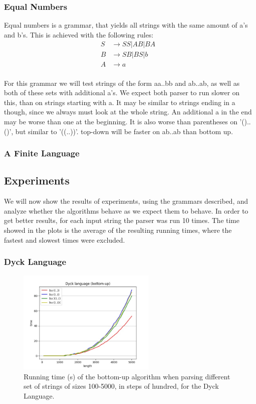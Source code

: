 \subsubsection{Equal Numbers}
Equal numbers is a grammar, that yields all strings with the same amount of a's and b's.
This is achieved with the following rules:
\begin{align*}
    S&\rightarrow SS|AB|BA\\
    B&\rightarrow SB|BS|b\\
    A&\rightarrow a\\
\end{align*}

For this grammar we will test strings of the form aa..bb and ab..ab, as well as both of these sets with additional a's.
We expect both parser to run slower on this, than on strings starting with a.
It may be similar to strings ending in a though, since we always must look at the whole string.
An additional a in the end may be worse than one at the beginning.
It is also worse than parentheses on '()..()', but similar to '((..))'.
top-down will be faster on ab..ab than bottom up.

\subsubsection{A Finite Language}

\subsection{Experiments}
We will now show the results of experiments, using the grammars described, and analyze whether  the algorithms behave as we expect them to behave.
In order to get better results, for each input string the parser was run 10 times.
The time showed in the plots is the average of the resulting running times, where the fastest and slowest times were excluded.

\subsubsection{Dyck Language}

\begin{figure}[!ht]
    \centering
    \includegraphics[width=0.6\textwidth]{Images/t_dyck_bu.jpg}
    \caption{Running time (s) of the bottom-up algorithm when parsing different set of strings of sizes 100-5000, in steps of hundred, for the Dyck Language.}
    \label{fig:t_dyck_bu}
\end{figure}

